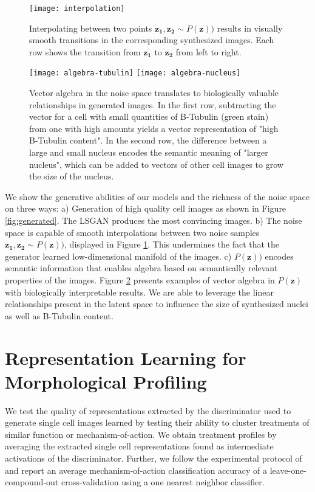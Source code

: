 \documentclass{article}
\begin{document}
\begin{figure}
  \centering
  \texttt{[image: interpolation]}
  \caption{Interpolating between two points $\mathbf{z_1}, \mathbf{z_2} \sim P(\mathbf{z}))$ results in visually smooth transitions in the corresponding synthesized images. Each row shows the transition from $\mathbf{z_1}$ to $\mathbf{z_2}$ from left to right.}
  \label{fig:interpolations}
  \vspace{-0.05cm}
\end{figure}

\begin{figure}
  \centering
  \texttt{[image: algebra-tubulin]}
  \texttt{[image: algebra-nucleus]}
  \caption{Vector algebra in the noise space translates to biologically valuable relationships in generated images. In the first row, subtracting the vector for a cell with small quantities of B-Tubulin (green stain) from one with high amounts yields a vector representation of "high B-Tubulin content". In the second row, the difference between a large and small nucleus encodes the semantic meaning of "larger nucleus", which can be added to vectors of other cell images to grow the size of the nucleus.}
  \label{fig:algebra}
\end{figure}

We show the generative abilities of our models and the richness of the noise space on three ways: a) Generation of high quality cell images as shown in Figure \ref{fig:generated}. The LSGAN produces the most convincing images. b) The noise space is capable of smooth interpolations between two noise samples $\mathbf{z_1}, \mathbf{z_2} \sim P(\mathbf{z}))$, displayed in Figure \ref{fig:interpolations}. This undermines the fact that the generator learned low-dimensional manifold of the images. c) $P(\mathbf{z}))$ encodes semantic information that enables algebra based on semantically relevant properties of the images. Figure \ref{fig:algebra} presents examples of vector algebra in $P(\mathbf{z})$ with biologically interpretable results. We are able to leverage the linear relationships present in the latent space to influence the size of synthesized nuclei as well as B-Tubulin content.

\section{Representation Learning for Morphological Profiling}\label{moa}
We test the quality of representations extracted by the discriminator used to generate single cell images learned by testing their ability to cluster treatments of similar function or mechanism-of-action. We obtain treatment profiles by averaging the extracted single cell representations found as intermediate activations of the discriminator. Further, we follow the experimental protocol of \cite{Ljosa2013} and report an average mechanism-of-action classification accuracy of a leave-one-compound-out cross-validation using a one nearest neighbor classifier.
\end{document}
